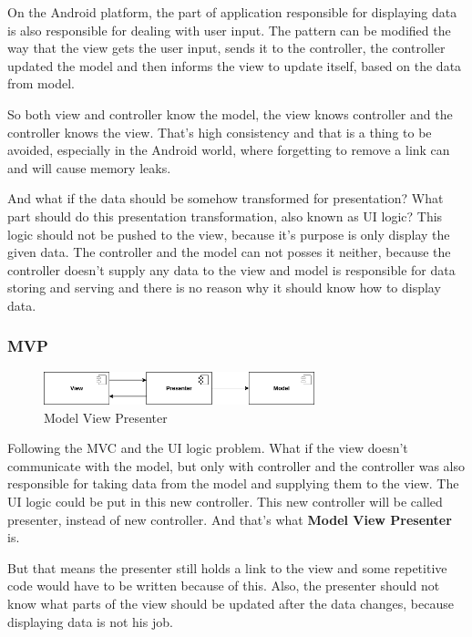 On the Android platform, the part of application responsible for displaying data is also responsible for dealing with user input.
The pattern can be modified the way that the view gets the user input, sends it to the controller, the controller updated the model and then informs the view to update itself, based on the data from model. \cite{droidcon}

So both view and controller know the model, the view knows controller and the controller knows the view.
That's high consistency and that is a thing to be avoided, especially in the Android world, where forgetting to remove a link can and will cause memory leaks.

And what if the data should be somehow transformed for presentation?
What part should do this presentation transformation, also known as UI logic?
This logic should not be pushed to the view, because it's purpose is only display the given data.
The controller and the model can not posses it neither, because the controller doesn't supply any data to the view and model is responsible for data storing and serving and there is no reason why it should know how to display data.

\subsubsection{MVP}

\begin{figure}\centering
	\includegraphics[width=0.7\textwidth]{pics/patterns/bc-mvp.png}
	\caption[MVP]{Model View Presenter}\label{fig:mvp}
\end{figure}

Following the MVC and the UI logic problem.
What if the view doesn't communicate with the model, but only with controller and the controller was also responsible for taking data from the model and supplying them to the view.
The UI logic could be put in this new controller. This new controller will be called presenter, instead of new controller.
And that's what \textbf{Model View Presenter} is. \cite{droidcon}

But that means the presenter still holds a link to the view and some repetitive code would have to be written because of this. \cite{mvp}
Also, the presenter should not know what parts of the view should be updated after the data changes, because displaying data is not his job.


